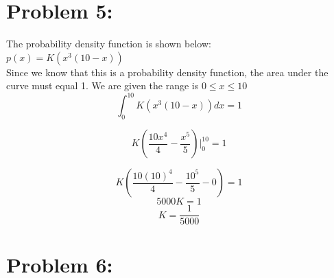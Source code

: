 \documentclass[a4paper,12pt]{article}
\begin{document}
\section*{Problem 5:}
The probability density function is shown below:\\
${p(x) = K(x^3(10-x))}$ \\
Since we know that this is a probability density function, the area under the curve must equal 1. We are given the range is ${0 \leq x \leq 10}$ \\

\[\int_{0}^{10} K(x^3(10-x)) dx = 1\] 

\[K(\frac{10x^4}{4} -  \frac{x^5}{5})\Biggr|_0^{10} = 1\] 

\[K(\frac{10(10)^4}{4} -  \frac{10^5}{5} - 0) = 1\] 
\[5000K = 1\] 
\[K = \frac{1}{5000}\]

\section*{Problem 6:}
\end{document}
